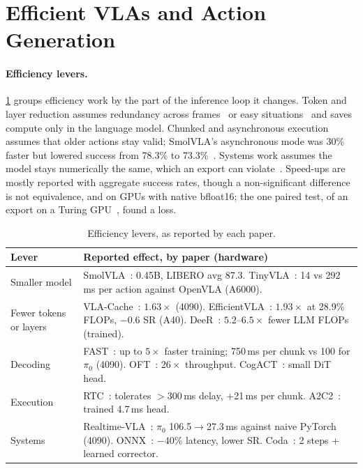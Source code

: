 \section{Efficient VLAs and Action Generation}
\label{sec:study}

\paragraph{Efficiency levers.}
\cref{tab:study} groups efficiency work by the part of the inference loop it changes.
Token and layer reduction assumes redundancy across frames~\cite{xu2026vla} or easy situations~\cite{yue2024deer} and saves compute only in the language model.
Chunked and asynchronous execution assumes that older actions stay valid; SmolVLA's asynchronous mode was 30\% faster but lowered success from 78.3\% to 73.3\%~\cite{shukor2025smolvla}.
Systems work assumes the model stays numerically the same, which an export can violate~\cite{islam2026faster}.
Speed-ups are mostly reported with aggregate success rates, though a non-significant difference is not equivalence, and on GPUs with native bfloat16; the one paired test, of an export on a Turing GPU~\cite{islam2026faster}, found a loss.

\begin{table}[t]
\centering\scriptsize
\setlength{\tabcolsep}{2pt}
\begin{tabular}{@{}>{\raggedright\arraybackslash}p{1.25cm}>{\raggedright\arraybackslash}p{6.6cm}@{}}
\toprule
Lever & Reported effect, by paper (hardware) \\
\midrule
Smaller model & SmolVLA~\cite{shukor2025smolvla}: 0.45B, LIBERO avg 87.3. TinyVLA~\cite{wen2025tinyvla}: 14 vs 292\,ms per action against OpenVLA (A6000). \\
Fewer tokens or layers & VLA-Cache~\cite{xu2026vla}: $1.63\times$ (4090). EfficientVLA~\cite{yang2026efficientvla}: $1.93\times$ at 28.9\% FLOPs, $-0.6$ SR (A40). DeeR~\cite{yue2024deer}: $5.2$--$6.5\times$ fewer LLM FLOPs (trained). \\
Decoding & FAST~\cite{pertsch2025fast}: up to $5\times$ faster training; 750\,ms per chunk vs 100 for $\pi_0$ (4090). OFT~\cite{kim2025fine}: $26\times$ throughput. CogACT~\cite{li2024cogact}: small DiT head. \\
Execution & RTC~\cite{black2026real}: tolerates $>$300\,ms delay, +21\,ms per chunk. A2C2~\cite{sendai2025leave}: trained 4.7\,ms head. \\
Systems & Realtime-VLA~\cite{ma2025running}: $\pi_0$ 106.5$\to$27.3\,ms against naive PyTorch (4090). ONNX~\cite{islam2026faster}: $-40$\% latency, lower SR. Coda~\cite{tang2026fewer}: 2 steps + learned corrector. \\
\bottomrule
\end{tabular}
\caption{Efficiency levers, as reported by each paper.}
\label{tab:study}
\end{table}

